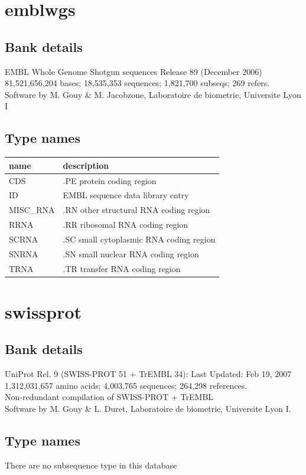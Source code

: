 \documentclass{article}
\begin{document}
\begin{Schunk}
\section{ emblwgs }
\subsection{Bank details}
EMBL Whole Genome Shotgun sequences Release 89  (December 2006)\\
81,521,656,204 bases; 18,535,353 sequences; 1,821,700 subseqs; 269 refers.\\
Software by M. Gouy \& M. Jacobzone, Laboratoire de biometrie, Universite Lyon I

\subsection{Type names}
\noindent\begin{tabular}{ll}
\hline \hline
name & description\\
\hline
CDS & .PE protein coding region \\
ID & EMBL sequence data library entry \\
MISC\_RNA & .RN other structural RNA coding region \\
RRNA & .RR ribosomal RNA coding region \\
SCRNA & .SC small cytoplasmic RNA coding region \\
SNRNA & .SN small nuclear RNA coding region \\
TRNA & .TR transfer RNA coding region \\
\hline \hline
\end{tabular}

\section{ swissprot }
\subsection{Bank details}
UniProt Rel. 9 (SWISS-PROT 51 + TrEMBL 34): Last Updated: Feb 19, 2007\\
1,312,031,657 amino acids; 4,003,765 sequences; 264,298 references.\\
Non-redundant compilation of SWISS-PROT + TrEMBL\\
Software by M. Gouy \& L. Duret, Laboratoire de biometrie, Universite Lyon I.

\subsection{Type names}
There are no subsequence type in this database

\end{Schunk}
\end{document}
